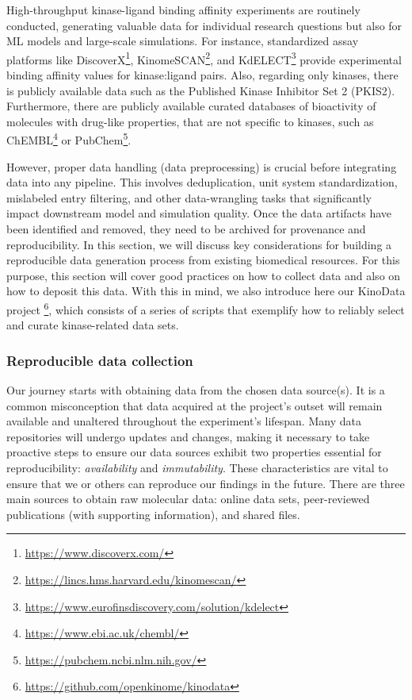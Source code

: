 \documentclass[9pt,lessons]{livecoms}
\begin{document}
High-throughput kinase-ligand binding affinity experiments are routinely conducted, generating valuable data for individual research questions but also for ML models and large-scale simulations.
For instance, standardized assay platforms like DiscoverX\footnote{\hyperlink{https://www.discoverx.com/}{https://www.discoverx.com/}}, KinomeSCAN\footnote{\hyperlink{https://lincs.hms.harvard.edu/kinomescan/}{https://lincs.hms.harvard.edu/kinomescan/}}, and KdELECT\footnote{\hyperlink{https://www.eurofinsdiscovery.com/solution/kdelect}{https://www.eurofinsdiscovery.com/solution/kdelect}} provide experimental binding affinity values for kinase:ligand pairs. Also, regarding only kinases, there is publicly available data such as the Published Kinase Inhibitor Set 2 (PKIS2). \cite{drewry2017progress} 
Furthermore, there are publicly available curated databases of bioactivity of molecules with drug-like properties, that are not specific to kinases, such as ChEMBL\footnote{\hyperlink{https://www.ebi.ac.uk/chembl/}{https://www.ebi.ac.uk/chembl/}}\cite{zdrazil2023chembl} or PubChem\footnote{\hyperlink{https://pubchem.ncbi.nlm.nih.gov/}{https://pubchem.ncbi.nlm.nih.gov/}}.

However, proper data handling (data preprocessing) is crucial before integrating data into any pipeline. 
This involves deduplication, unit system standardization, mislabeled entry filtering, and other data-wrangling tasks that significantly impact downstream model and simulation quality. 
Once the data artifacts have been identified and removed, they need to be archived for provenance and reproducibility. 
In this section, we will discuss key considerations for building a reproducible data generation process from existing biomedical resources. For this purpose, this section will cover good practices on how to collect data and also on how to deposit this data. With this in mind, we also introduce here our KinoData project \footnote{\hyperlink{https://github.com/openkinome/kinodata}{https://github.com/openkinome/kinodata}}, which consists of a series of scripts that exemplify how to reliably select and curate kinase-related data sets.


\subsubsection{Reproducible data collection}

Our journey starts with obtaining data from the chosen data source(s).
It is a common misconception that data acquired at the project's outset will remain available and unaltered throughout the experiment's lifespan. 
Many data repositories will undergo updates and changes, making it necessary to take proactive steps to ensure our data sources exhibit two properties essential for reproducibility: \textit{availability} and \textit{immutability}.
These characteristics are vital to ensure that we or others can reproduce our findings in the future. 
There are three main sources to obtain raw molecular data: online data sets, peer-reviewed publications (with supporting information), and shared files. 
\end{document}
